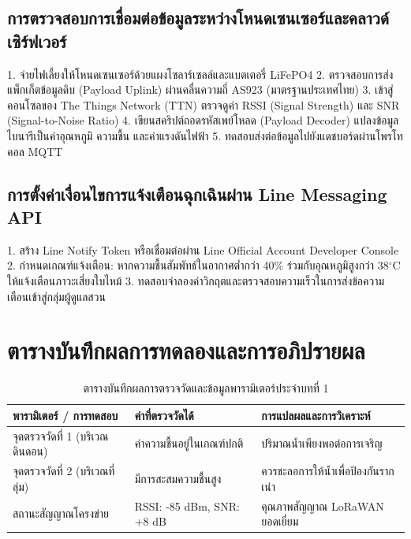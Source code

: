 \subsection{การตรวจสอบการเชื่อมต่อข้อมูลระหว่างโหนดเซนเซอร์และคลาวด์เซิร์ฟเวอร์}
\begin{sensorbox}
1. จ่ายไฟเลี้ยงให้โหนดเซนเซอร์ด้วยแผงโซลาร์เซลล์และแบตเตอรี่ LiFePO4
2. ตรวจสอบการส่งแพ็กเก็ตข้อมูลดิบ (Payload Uplink) ผ่านคลื่นความถี่ AS923 (มาตรฐานประเทศไทย)
3. เข้าสู่คอนโซลของ The Things Network (TTN) ตรวจดูค่า RSSI (Signal Strength) และ SNR (Signal-to-Noise Ratio)
4. เขียนสคริปต์ถอดรหัสเพย์โหลด (Payload Decoder) แปลงข้อมูลไบนารีเป็นค่าอุณหภูมิ ความชื้น และค่าแรงดันไฟฟ้า
5. ทดสอบส่งต่อข้อมูลไปยังแดชบอร์ดผ่านโพรโทคอล MQTT
\end{sensorbox}

\subsection{การตั้งค่าเงื่อนไขการแจ้งเตือนฉุกเฉินผ่าน Line Messaging API}
\begin{sensorbox}
1. สร้าง Line Notify Token หรือเชื่อมต่อผ่าน Line Official Account Developer Console
2. กำหนดเกณฑ์แจ้งเตือน: หากความชื้นสัมพัทธ์ในอากาศต่ำกว่า 40\% ร่วมกับอุณหภูมิสูงกว่า 38$^{\circ}$C ให้แจ้งเตือนภาวะเสี่ยงใบไหม้
3. ทดสอบจำลองค่าวิกฤตและตรวจสอบความเร็วในการส่งข้อความเตือนเข้าสู่กลุ่มผู้ดูแลสวน
\end{sensorbox}

\section{ตารางบันทึกผลการทดลองและการอภิปรายผล}
\begin{table}[H]
\centering\small
\caption{ตารางบันทึกผลการตรวจวัดและข้อมูลพารามิเตอร์ประจำบทที่ 1}
\label{tab:ch01_datasheet}
\begin{tabularx}{\textwidth}{p{} p{} X}
\toprule
\textbf{พารามิเตอร์ / การทดสอบ} & \textbf{ค่าที่ตรวจวัดได้} & \textbf{การแปลผลและการวิเคราะห์} \\
\midrule
จุดตรวจวัดที่ 1 (บริเวณดินดอน) & ค่าความชื้นอยู่ในเกณฑ์ปกติ & ปริมาณน้ำเพียงพอต่อการเจริญ \\
จุดตรวจวัดที่ 2 (บริเวณที่ลุ่ม) & มีการสะสมความชื้นสูง & ควรชะลอการให้น้ำเพื่อป้องกันรากเน่า \\
สถานะสัญญาณโครงข่าย & RSSI: -85 dBm, SNR: +8 dB & คุณภาพสัญญาณ LoRaWAN ยอดเยี่ยม \\
\bottomrule
\end{tabularx}
\end{table}

